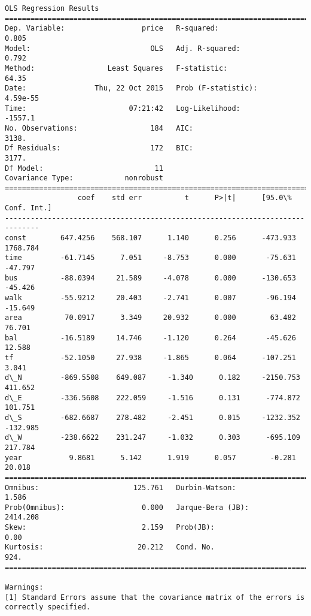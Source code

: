 \documentclass[a4paper,dvipdfmx]{jsarticle}
\begin{document}
    \begin{Verbatim}[commandchars=\\\{\}]
OLS Regression Results                            
==============================================================================
Dep. Variable:                  price   R-squared:                       0.805
Model:                            OLS   Adj. R-squared:                  0.792
Method:                 Least Squares   F-statistic:                     64.35
Date:                Thu, 22 Oct 2015   Prob (F-statistic):           4.59e-55
Time:                        07:21:42   Log-Likelihood:                -1557.1
No. Observations:                 184   AIC:                             3138.
Df Residuals:                     172   BIC:                             3177.
Df Model:                          11                                         
Covariance Type:            nonrobust                                         
==============================================================================
                 coef    std err          t      P>|t|      [95.0\% Conf. Int.]
------------------------------------------------------------------------------
const        647.4256    568.107      1.140      0.256      -473.933  1768.784
time         -61.7145      7.051     -8.753      0.000       -75.631   -47.797
bus          -88.0394     21.589     -4.078      0.000      -130.653   -45.426
walk         -55.9212     20.403     -2.741      0.007       -96.194   -15.649
area          70.0917      3.349     20.932      0.000        63.482    76.701
bal          -16.5189     14.746     -1.120      0.264       -45.626    12.588
tf           -52.1050     27.938     -1.865      0.064      -107.251     3.041
d\_N         -869.5508    649.087     -1.340      0.182     -2150.753   411.652
d\_E         -336.5608    222.059     -1.516      0.131      -774.872   101.751
d\_S         -682.6687    278.482     -2.451      0.015     -1232.352  -132.985
d\_W         -238.6622    231.247     -1.032      0.303      -695.109   217.784
year           9.8681      5.142      1.919      0.057        -0.281    20.018
==============================================================================
Omnibus:                      125.761   Durbin-Watson:                   1.586
Prob(Omnibus):                  0.000   Jarque-Bera (JB):             2414.208
Skew:                           2.159   Prob(JB):                         0.00
Kurtosis:                      20.212   Cond. No.                         924.
==============================================================================

Warnings:
[1] Standard Errors assume that the covariance matrix of the errors is correctly specified.
    \end{Verbatim}
\end{document}
